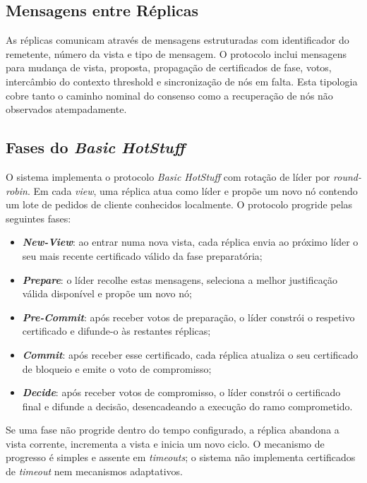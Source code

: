 \documentclass[runningheads]{llncs}
\begin{document}
\subsection{Mensagens entre R\'eplicas}
As r\'eplicas comunicam atrav\'es de mensagens estruturadas com identificador do remetente, n\'umero da vista e tipo de mensagem. O protocolo inclui mensagens para mudan\c{c}a de vista, proposta, propaga\c{c}\~ao de certificados de fase, votos, interc\^ambio do contexto threshold e sincroniza\c{c}\~ao de n\'os em falta. Esta tipologia cobre tanto o caminho nominal do consenso como a recupera\c{c}\~ao de n\'os n\~ao observados atempadamente.

\subsection{Fases do \textit{Basic HotStuff}}
O sistema implementa o protocolo \textit{Basic HotStuff} com rota\c{c}\~ao de l\'ider por \textit{round-robin}. Em cada \textit{view}, uma r\'eplica atua como l\'ider e prop\~oe um novo n\'o contendo um lote de pedidos de cliente conhecidos localmente. O protocolo progride pelas seguintes fases:
\vspace{-0.4em}
\begin{itemize}
\item \textbf{\textit{New-View}}: ao entrar numa nova vista, cada r\'eplica envia ao pr\'oximo l\'ider o seu mais recente certificado v\'alido da fase preparat\'oria;
\item \textbf{\textit{Prepare}}: o l\'ider recolhe estas mensagens, seleciona a melhor justifica\c{c}\~ao v\'alida dispon\'ivel e prop\~oe um novo n\'o;
\item \textbf{\textit{Pre-Commit}}: ap\'os receber votos de prepara\c{c}\~ao, o l\'ider constr\'oi o respetivo certificado e difunde-o \`as restantes r\'eplicas;
\item \textbf{\textit{Commit}}: ap\'os receber esse certificado, cada r\'eplica atualiza o seu certificado de bloqueio e emite o voto de compromisso;
\item \textbf{\textit{Decide}}: ap\'os receber votos de compromisso, o l\'ider constr\'oi o certificado final e difunde a decis\~ao, desencadeando a execu\c{c}\~ao do ramo comprometido.
\end{itemize}
Se uma fase n\~ao progride dentro do tempo configurado, a r\'eplica abandona a vista corrente, incrementa a vista e inicia um novo ciclo. O mecanismo de progresso \'e simples e assente em \textit{timeouts}; o sistema n\~ao implementa certificados de \textit{timeout} nem mecanismos adaptativos.
\end{document}
